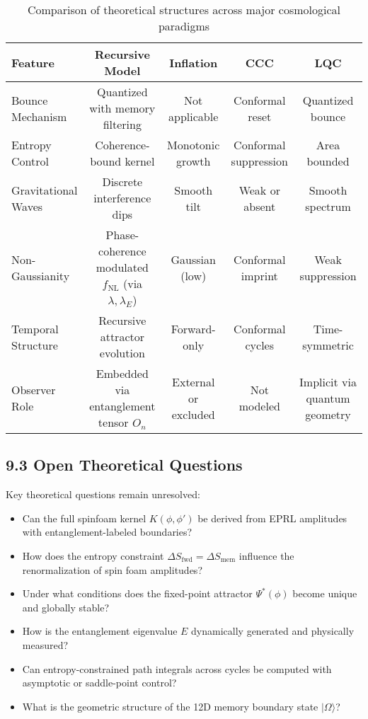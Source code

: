 \begin{table}[H]
\centering
\begin{tabular}{|l|c|c|c|c|}
\hline
\textbf{Feature} & \textbf{Recursive Model} & \textbf{Inflation} & \textbf{CCC} & \textbf{LQC} \\
\hline
Bounce Mechanism & Quantized with memory filtering & Not applicable & Conformal reset & Quantized bounce \\
Entropy Control & Coherence-bound kernel & Monotonic growth & Conformal suppression & Area bounded \\
Gravitational Waves & Discrete interference dips & Smooth tilt & Weak or absent & Smooth spectrum \\
Non-Gaussianity & Phase-coherence modulated \( f_{\text{NL}} \) (via \( \lambda, \lambda_E \)) & Gaussian (low) & Conformal imprint & Weak suppression \\
Temporal Structure & Recursive attractor evolution & Forward-only & Conformal cycles & Time-symmetric \\
Observer Role & Embedded via entanglement tensor \( O_n \) & External or excluded & Not modeled & Implicit via quantum geometry \\
\hline
\end{tabular}
\caption{Comparison of theoretical structures across major cosmological paradigms}
\end{table}

\subsection{9.3 Open Theoretical Questions}

Key theoretical questions remain unresolved:
\begin{itemize}
    \item Can the full spinfoam kernel \( K(\phi, \phi') \) be derived from EPRL amplitudes with entanglement-labeled boundaries?
    \item How does the entropy constraint \( \Delta S_{\text{fwd}} = \Delta S_{\text{mem}} \) influence the renormalization of spin foam amplitudes?
    \item Under what conditions does the fixed-point attractor \( \Psi^*(\phi) \) become unique and globally stable?
    \item How is the entanglement eigenvalue \( E \) dynamically generated and physically measured?
    \item Can entropy-constrained path integrals across cycles be computed with asymptotic or saddle-point control?
    \item What is the geometric structure of the 12D memory boundary state \( |\Omega\rangle \)?
\end{itemize}

